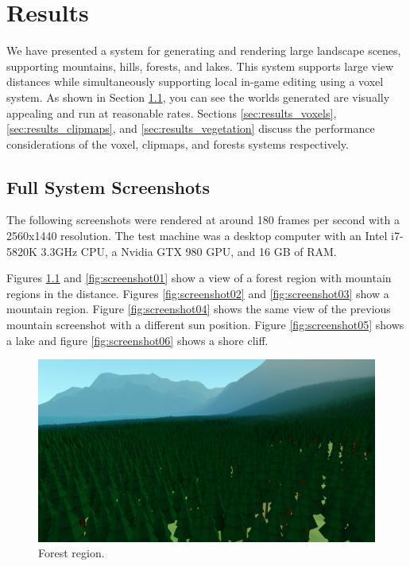 
\chapter{Results} \label{results}

We have presented a system for generating and rendering large landscape scenes, supporting mountains, hills, forests, and lakes.
This system supports large view distances while simultaneously supporting local in-game editing using a voxel system.
As shown in Section \ref{sec:screenshots}, you can see the worlds generated are visually appealing and run at reasonable rates.
Sections \ref{sec:results_voxels}, \ref{sec:results_clipmaps}, and \ref{sec:results_vegetation} discuss the performance considerations of the voxel, clipmaps, and forests systems respectively.

\section{Full System Screenshots} \label{sec:screenshots}

The following screenshots were rendered at around 180 frames per second with a 2560x1440 resolution.
The test machine was a desktop computer with an Intel i7-5820K 3.3GHz CPU, a Nvidia GTX 980 GPU, and 16 GB of RAM.

Figures \ref{fig:screenshot00} and \ref{fig:screenshot01} show a view of a forest region with mountain regions in the distance.
Figures \ref{fig:screenshot02} and \ref{fig:screenshot03} show a mountain region.
Figure \ref{fig:screenshot04} shows the same view of the previous mountain screenshot with a different sun position.
Figure \ref{fig:screenshot05} shows a lake and figure \ref{fig:screenshot06} shows a shore cliff.

\begin{figure}
	\centering
		\includegraphics[width=1.0\textwidth]{figures/Screenshot000000.jpg}
	\caption{Forest region.}
	\label{fig:screenshot00}
\end{figure}

